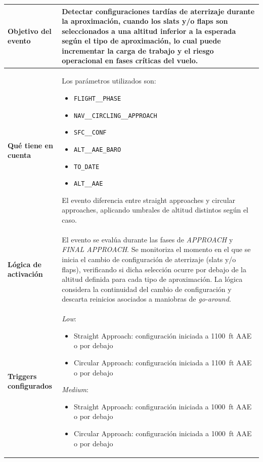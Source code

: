 \documentclass[11pt,a4paper]{article}
\begin{document}
	\renewcommand{\arraystretch}{1.3}
	\begin{longtable}{p{5cm} p{9.5cm}}
		\hline
		\textbf{Objetivo del evento} &
		Detectar configuraciones tardías de aterrizaje durante la aproximación, cuando los slats y/o flaps son seleccionados a una altitud inferior a la esperada según el tipo de aproximación, lo cual puede incrementar la carga de trabajo y el riesgo operacional en fases críticas del vuelo. \\
		\hline
		
		\textbf{Qué tiene en cuenta} &
		Los parámetros utilizados son:
		\begin{itemize}
			\item \texttt{FLIGHT\_\_PHASE}
			\item \texttt{NAV\_\_CIRCLING\_\_APPROACH}
			\item \texttt{SFC\_\_CONF}
			\item \texttt{ALT\_\_AAE\_BARO}
			\item \texttt{TO\_DATE}
			\item \texttt{ALT\_\_AAE}
		\end{itemize}
		El evento diferencia entre straight approaches y circular approaches, aplicando umbrales de altitud distintos según el caso. \\
		\hline
		
		\textbf{Lógica de activación} &
		El evento se evalúa durante las fases de \textit{APPROACH} y \textit{FINAL APPROACH}.  
		Se monitoriza el momento en el que se inicia el cambio de configuración de aterrizaje (slats y/o flaps), verificando si dicha selección ocurre por debajo de la altitud definida para cada tipo de aproximación.  
		La lógica considera la continuidad del cambio de configuración y descarta reinicios asociados a maniobras de \textit{go-around}. \\
		\hline
		
		\textbf{Triggers configurados} &
		\textit{Low}:  
		\begin{itemize}
			\item Straight Approach: configuración iniciada a \SI{1100}{ft} AAE o por debajo
			\item Circular Approach: configuración iniciada a \SI{1100}{ft} AAE o por debajo
		\end{itemize}
		
		\textit{Medium}:  
		\begin{itemize}
			\item Straight Approach: configuración iniciada a \SI{1000}{ft} AAE o por debajo
			\item Circular Approach: configuración iniciada a \SI{1000}{ft} AAE o por debajo
		\end{itemize}
		

\end{longtable}
\end{document}
